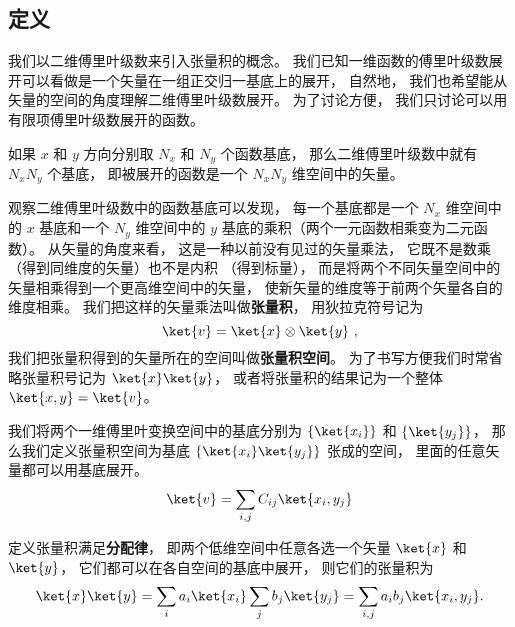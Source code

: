 

\subsection{定义}

我们以二维傅里叶级数来引入张量积的概念。 我们已知一维函数的傅里叶级数展开可以看做是一个矢量在一组正交归一基底上的展开， 自然地， 我们也希望能从矢量的空间的角度理解二维傅里叶级数展开。 为了讨论方便， 我们只讨论可以用有限项傅里叶级数展开的函数。

如果 $x$ 和 $y$ 方向分别取 $N_x$ 和 $N_y$ 个函数基底， 那么二维傅里叶级数中就有 $N_xN_y$ 个基底， 即被展开的函数是一个 $N_xN_y$ 维空间中的矢量。

观察二维傅里叶级数中的函数基底可以发现， 每一个基底都是一个 $N_x$ 维空间中的 $x$ 基底和一个 $N_y$ 维空间中的 $y$ 基底的乘积（两个一元函数相乘变为二元函数）。 从矢量的角度来看， 这是一种以前没有见过的矢量乘法， 它既不是数乘%
（得到同维度的矢量）也不是内积%
（得到标量）， 而是将两个不同矢量空间中的矢量相乘得到一个更高维空间中的矢量， 使新矢量的维度等于前两个矢量各自的维度相乘。 我们把这样的矢量乘法叫做\textbf{张量积}， 用狄拉克符号记为
\begin{equation}
\ket{v} = \ket{x} \otimes \ket{y}~,
\end{equation}
我们把张量积得到的矢量所在的空间叫做\textbf{张量积空间}。 为了书写方便我们时常省略张量积号记为 $\ket{x}\ket{y}$， 或者将张量积的结果记为一个整体 $\ket{x, y} = \ket{v}$。

我们将两个一维傅里叶变换空间中的基底分别为 $\{\ket{x_i}\}$ 和 $\{\ket{y_j}\}$， 那么我们定义张量积空间为基底 $\{\ket{x_i}\ket{y_j}\}$ 张成的空间， 里面的任意矢量都可以用基底展开。
\begin{equation}
\ket{v} = \sum_{i,j} C_{ij}\ket{x_i, y_j}
\end{equation}

定义张量积满足\textbf{分配律}， 即两个低维空间中任意各选一个矢量 $\ket{x}$ 和 $\ket{y}$， 它们都可以在各自空间的基底中展开， 则它们的张量积为
\begin{equation}\label{DirPro_eq2}
\ket{x}\ket{y} = \sum_i a_i\ket{x_i} \sum_j b_j\ket{y_j}
= \sum_{i,j} a_i b_j \ket{x_i, y_j}.
\end{equation}

